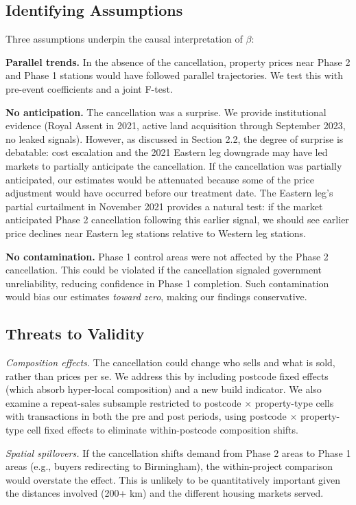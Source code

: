 \documentclass[12pt]{article}
\begin{document}
\subsection{Identifying Assumptions}

Three assumptions underpin the causal interpretation of $\beta$:

\textbf{Parallel trends.} In the absence of the cancellation, property prices near Phase 2 and Phase 1 stations would have followed parallel trajectories. We test this with pre-event coefficients and a joint F-test.

\textbf{No anticipation.} The cancellation was a surprise. We provide institutional evidence (Royal Assent in 2021, active land acquisition through September 2023, no leaked signals). However, as discussed in Section 2.2, the degree of surprise is debatable: cost escalation and the 2021 Eastern leg downgrade may have led markets to partially anticipate the cancellation. If the cancellation was partially anticipated, our estimates would be attenuated because some of the price adjustment would have occurred before our treatment date. The Eastern leg's partial curtailment in November 2021 provides a natural test: if the market anticipated Phase 2 cancellation following this earlier signal, we should see earlier price declines near Eastern leg stations relative to Western leg stations.

\textbf{No contamination.} Phase 1 control areas were not affected by the Phase 2 cancellation. This could be violated if the cancellation signaled government unreliability, reducing confidence in Phase 1 completion. Such contamination would bias our estimates \textit{toward zero}, making our findings conservative.

\subsection{Threats to Validity}

\textit{Composition effects.} The cancellation could change who sells and what is sold, rather than prices per se. We address this by including postcode fixed effects (which absorb hyper-local composition) and a new build indicator. We also examine a repeat-sales subsample restricted to postcode $\times$ property-type cells with transactions in both the pre and post periods, using postcode $\times$ property-type cell fixed effects to eliminate within-postcode composition shifts.

\textit{Spatial spillovers.} If the cancellation shifts demand from Phase 2 areas to Phase 1 areas (e.g., buyers redirecting to Birmingham), the within-project comparison would overstate the effect. This is unlikely to be quantitatively important given the distances involved (200+ km) and the different housing markets served.
\end{document}
